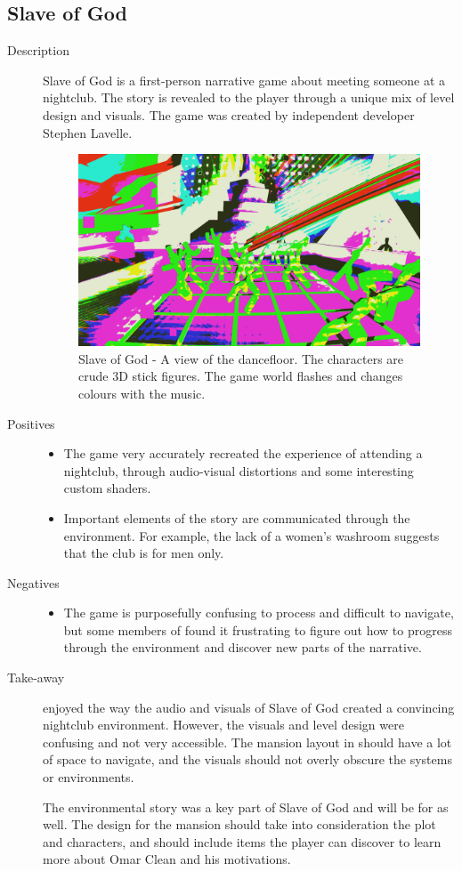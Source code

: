 \subsection{Slave of God}
\begin{description}
\item[Description]{Slave of God is a first-person narrative game about meeting someone at a nightclub. The story is revealed to the player through a unique mix of level design and visuals. The game was created by independent developer Stephen Lavelle.

\begin{figure}[htb]
	\centering\includegraphics[width=.25\linewidth]{images/slave}
	\caption{Slave of God - A view of the dancefloor. The characters are crude 3D stick figures. The game world flashes and changes colours with the music.}
\end{figure}}
\item[Positives]{
\begin{itemize}
\item{The game very accurately recreated the experience of attending a nightclub, through audio-visual distortions and some interesting custom shaders.}
\item{Important elements of the story are communicated through the environment. For example, the lack of a women's washroom suggests that the club is for men only.}
\end{itemize}
}
\item[Negatives]{
\begin{itemize}
\item{The game is purposefully confusing to process and difficult to navigate, but some members of \ourteam{} found it frustrating to figure out how to progress through the environment and discover new parts of the narrative.}
\end{itemize}
}
\item[Take-away]{\ourteam{} enjoyed the way the audio and visuals of Slave of God created a convincing nightclub environment. However, the visuals and level design were confusing and not very accessible. The mansion layout in \ourgame{} should have a lot of space to navigate, and the visuals should not overly obscure the systems or environments.

The environmental story was a key part of Slave of God and will be for \ourgame{} as well. The design for the mansion should take into consideration the plot and characters, and should include items the player can discover to learn more about Omar Clean and his motivations.}
\end{description}





